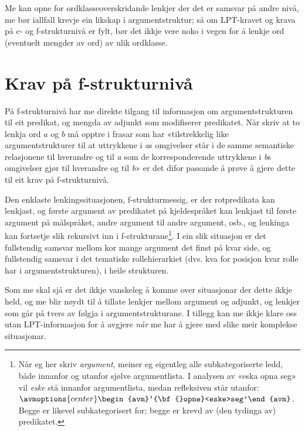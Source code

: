 \documentclass[12pt,a4paper,oneside,draft]{report}
\begin{document}
Me kan opne for ordklasseoverskridande lenkjer der det er samsvar på
andre nivå, me bør iallfall krevje ein likskap i argumentstruktur; så
om LPT-kravet og krava på c- og f\hyp{}strukturnivå er fylt, bør det ikkje
vere noko i vegen for å lenkje ord (eventuelt mengder av ord) av ulik
ordklasse.


\section{Krav på f\hyp{}strukturnivå}
\label{sec-3.6}

 
På f\hyp{}strukturnivå har me direkte tilgang til informasjon om
argumentstrukturen til eit predikat, og mengda av adjunkt som
modifiserer predikatet. Når \citet[s.~3]{thunes2003eal} skriv at to
lenkja ord $a$ og $b$ må opptre i frasar som har «tilstrekkelig like
argumentstrukturer til at uttrykkene i \emph{a}s omgivelser står i de
samme semantiske relasjonene til hverandre og til \emph{a} som de
korresponderende uttrykkene i \emph{b}s omgivelser gjør til hverandre
og til \emph{b}» er det difor passande å prøve å gjere dette til eit
krav på f\hyp{}strukturnivå.

Den enklaste lenkingssituasjonen, f\hyp{}strukturmessig, er der
rotpredikata kan lenkjast, og første argument av predikatet på
kjeldespråket kan lenkjast til første argument på målspråket, andre
argument til andre argument, osb., og lenkinga kan fortsetje slik
rekursivt inn i f\hyp{}strukturane\footnote{Når eg her skriv \emph{argument}, meiner eg eigentleg alle
        subkategoriserte ledd, både innanfor og utanfor sjølve
        argumentlista. I analysen av «eska opna seg» vil \emph{eske} stå
        innanfor argumentlista, medan refleksiven står utanfor:
        ${\avmoptions{center}\begin{avm}`{\bf{}opne}<eske>seg'\end{avm}}$.
        Begge er likevel subkategorisert for; begge er krevd av (den
        tydinga av) predikatet. }. I ein slik situasjon er det fullstendig
samsvar mellom kor mange argument det finst på kvar side, og
fullstendig samsvar i det tematiske rollehierarkiet (dvs. kva for
posisjon kvar rolle har i argumentstrukturen), i heile strukturen.

Som me skal sjå er det ikkje vanskeleg å komme over situasjonar der
dette ikkje held, og me blir nøydt til å tillate lenkjer mellom
argument og adjunkt, og lenkjer som går på tvers av følgja i
argumentstrukturane. I tillegg kan me ikkje klare oss utan
LPT\hyp{}informasjon for å avgjere \emph{når} me har å gjere med slike meir
komplekse situasjonar. 
\end{document}

